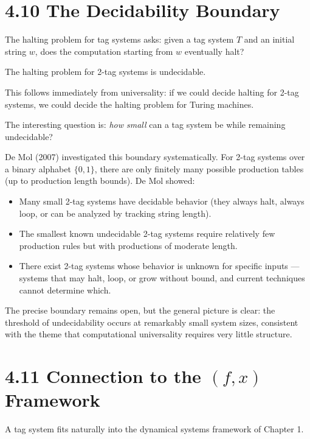 \section{4.10 The Decidability Boundary}

The halting problem for tag systems asks: given a tag system $T$ and an initial string $w$, does the computation starting from $w$ eventually halt?

\begin{theorem}
The halting problem for 2-tag systems is undecidable.

This follows immediately from universality: if we could decide halting for 2-tag systems, we could decide the halting problem for Turing machines.

The interesting question is: \textit{how small} can a tag system be while remaining undecidable?

De Mol (2007) investigated this boundary systematically. For 2-tag systems over a binary alphabet $\{ 0, 1\} $, there are only finitely many possible production tables (up to production length bounds). De Mol showed:
\end{theorem}

\begin{itemize}
  \item Many small 2-tag systems have decidable behavior (they always halt, always loop, or can be analyzed by tracking string length).
  \item The smallest known undecidable 2-tag systems require relatively few production rules but with productions of moderate length.
  \item There exist 2-tag systems whose behavior is unknown for specific inputs --- systems that may halt, loop, or grow without bound, and current techniques cannot determine which.
\end{itemize}

The precise boundary remains open, but the general picture is clear: the threshold of undecidability occurs at remarkably small system sizes, consistent with the theme that computational universality requires very little structure.

\section{4.11 Connection to the $(f, x)$ Framework}

A tag system fits naturally into the dynamical systems framework of Chapter 1.

